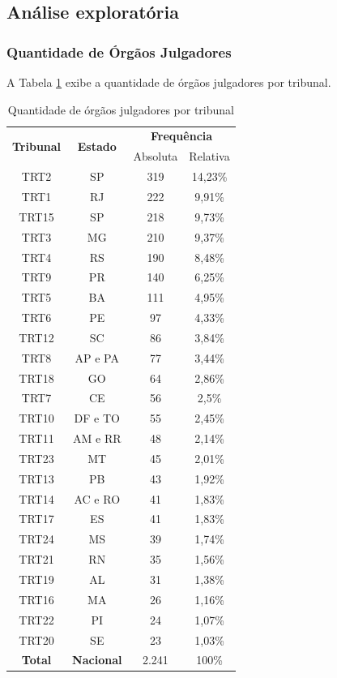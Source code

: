 \subsection{Análise exploratória}
\subsubsection{Quantidade de Órgãos Julgadores}

A Tabela \ref{tbl:tribunais_qtd_ojs} exibe a quantidade de órgãos julgadores por tribunal.

\begin{table}[ht]
\centering
\caption{Quantidade de órgãos julgadores por tribunal}
\begin{tabular}{cc|cc}
  \hline
  \multirow{2}{*}{\textbf{Tribunal}} & \multirow{2}{*}{\textbf{Estado}} &  \multicolumn{2}{c}{\textbf{Frequência}} \\
  \cline{3-4}
  &  & Absoluta & Relativa \\ 
 
   \hline
  TRT2 & SP & 319 & 14,23\% \\ 
  TRT1 & RJ & 222 & 9,91\% \\ 
  TRT15 & SP & 218 & 9,73\% \\ 
  TRT3 & MG & 210 & 9,37\% \\ 
  TRT4 & RS & 190 & 8,48\% \\ 
  TRT9 & PR & 140 & 6,25\% \\ 
  TRT5 & BA & 111 & 4,95\% \\ 
  TRT6 & PE &  97 & 4,33\% \\ 
  TRT12 & SC &  86 & 3,84\% \\ 
  TRT8 & AP e PA &  77 & 3,44\% \\ 
  TRT18 & GO &  64 & 2,86\% \\ 
  TRT7 & CE &  56 & 2,5\% \\ 
  TRT10 & DF e TO &  55 & 2,45\% \\ 
  TRT11 & AM e RR &  48 & 2,14\% \\ 
  TRT23 & MT &  45 & 2,01\% \\ 
  TRT13 & PB &  43 & 1,92\% \\ 
  TRT14 & AC e RO &  41 & 1,83\% \\ 
  TRT17 & ES &  41 & 1,83\% \\ 
  TRT24 & MS &  39 & 1,74\% \\ 
  TRT21 & RN &  35 & 1,56\% \\ 
  TRT19 & AL &  31 & 1,38\% \\ 
  TRT16 & MA &  26 & 1,16\% \\ 
  TRT22 & PI &  24 & 1,07\% \\ 
  TRT20 & SE &  23 & 1,03\% \\
  \hline
  \textbf{Total} & \textbf{Nacional} & 2.241 & 100\% \\ \hline
\end{tabular}
\label{tbl:tribunais_qtd_ojs}
\end{table}

